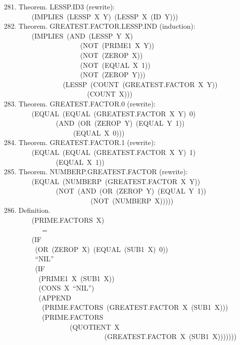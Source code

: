 \documentclass[10pt]{book}
\newenvironment{pubasis}{\begin{flushleft}}{\end{flushleft}}
\begin{document}
\begin{pubasis}
281.    Theorem.  LESSP.ID3 (rewrite):\\
~~~~~~~~(IMPLIES~(LESSP~X~Y)~(LESSP~X~(ID~Y)))\\

282.    Theorem.  GREATEST.FACTOR.LESSP.IND (induction):\\
~~~~~~~~(IMPLIES~(AND~(LESSP~Y~X)\\
~~~~~~~~~~~~~~~~~~~~~~(NOT~(PRIME1~X~Y))\\
~~~~~~~~~~~~~~~~~~~~~~(NOT~(ZEROP~X))\\
~~~~~~~~~~~~~~~~~~~~~~(NOT~(EQUAL~X~1))\\
~~~~~~~~~~~~~~~~~~~~~~(NOT~(ZEROP~Y)))\\
~~~~~~~~~~~~~~~~~(LESSP~(COUNT~(GREATEST.FACTOR~X~Y))\\
~~~~~~~~~~~~~~~~~~~~~~~~(COUNT~X)))\\

283.    Theorem.  GREATEST.FACTOR.0 (rewrite):\\
~~~~~~~~(EQUAL~(EQUAL~(GREATEST.FACTOR~X~Y)~0)\\
~~~~~~~~~~~~~~~(AND~(OR~(ZEROP~Y)~(EQUAL~Y~1))\\
~~~~~~~~~~~~~~~~~~~~(EQUAL~X~0)))\\

284.    Theorem.  GREATEST.FACTOR.1 (rewrite):\\
~~~~~~~~(EQUAL~(EQUAL~(GREATEST.FACTOR~X~Y)~1)\\
~~~~~~~~~~~~~~~(EQUAL~X~1))\\

285.    Theorem.  NUMBERP.GREATEST.FACTOR (rewrite):\\
~~~~~~~~(EQUAL~(NUMBERP~(GREATEST.FACTOR~X~Y))\\
~~~~~~~~~~~~~~~(NOT~(AND~(OR~(ZEROP~Y)~(EQUAL~Y~1))\\
~~~~~~~~~~~~~~~~~~~~~~~~~(NOT~(NUMBERP~X)))))\\

286.    Definition.\\
~~~~~~~~(PRIME.FACTORS~X)\\
~~~~~~~~~~~=\\
~~~~~~~~(IF\\
~~~~~~~~~(OR~(ZEROP~X)~(EQUAL~(SUB1~X)~0))\\
~~~~~~~~~``NIL''\\
~~~~~~~~~(IF\\
~~~~~~~~~~(PRIME1~X~(SUB1~X))\\
~~~~~~~~~~(CONS~X~``NIL'')\\
~~~~~~~~~~(APPEND\\
~~~~~~~~~~~(PRIME.FACTORS~(GREATEST.FACTOR~X~(SUB1~X)))\\
~~~~~~~~~~~(PRIME.FACTORS\\
~~~~~~~~~~~~~~~~~~~(QUOTIENT~X\\
~~~~~~~~~~~~~~~~~~~~~~~~~~~~~(GREATEST.FACTOR~X~(SUB1~X)))))))\\


\end{pubasis}
\end{document}
